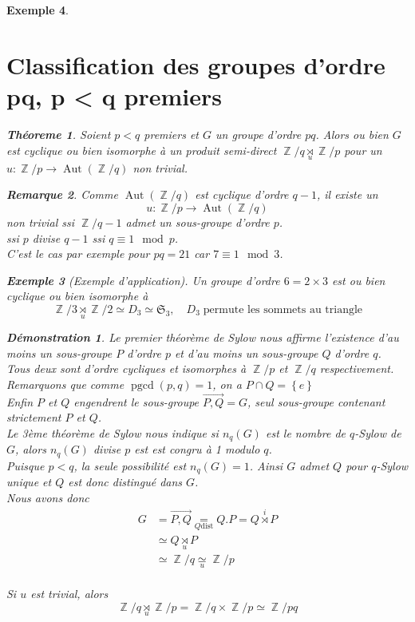 \documentclass[a4paper, oneside]{report}
\theoremstyle{break}
\newtheorem{thm}{Théoreme}[section] %
\newtheorem{exemple}[thm]{Exemple}
\newtheorem{remarque}[thm]{Remarque}
\newtheorem*{demonstration}{Démonstration}
\DeclareMathOperator{\Z}{\mathbb{Z}}
\DeclarePairedDelimiter\ens{\left\{ }{\right\} }%
\DeclareMathOperator{\pgcd}{pgcd}
\DeclareMathOperator{\Aut}{Aut}
\renewcommand{\ens}[1]{\left\{ #1 \right\} }%
\newcommand{\us}{\underset}
\newcommand{\os}{\overset}
\begin{document}
\begin{exemple}
\section{Classification des groupes d'ordre pq, p < q premiers}

\begin{thm}
Soient $p < q$ premiers et $G$ un groupe d'ordre $pq$. Alors ou bien $G$ est cyclique ou bien isomorphe à un produit semi-direct $\Z/q \us{u}{\rtimes} \Z/p$ pour un $u : \Z/p \rightarrow \Aut(\Z/q)$ non trivial.
\end{thm}

\begin{remarque}
Comme $\Aut(\Z/q)$ est cyclique d'ordre $q - 1$, il existe un 
\[
u : \Z/p \rightarrow \Aut(\Z/q)
\]
non trivial ssi $\Z/q-1$ admet un sous-groupe d'ordre $p$.\\
ssi $p$ divise $q - 1$ ssi $q \equiv 1 \mod p$.\\
C'est le cas par exemple pour $pq = 21$ car $7 \equiv 1 \mod 3$.
\end{remarque}

\begin{exemple}[Exemple d'application]
Un groupe d'ordre $6 = 2 \times 3$ est ou bien cyclique ou bien isomorphe à
\[
\Z/3 \us{u}{\rtimes} \Z/2 \simeq D_3	\simeq \mathfrak{S}_3, \quad	D_3 \; \text{permute les sommets au triangle}
\]
\end{exemple}

\begin{demonstration}
Le premier théorème de Sylow nous affirme l'existence d'au moins un sous-groupe $P$ d'ordre $p$ et d'au moins un sous-groupe $Q$ d'ordre $q$. Tous deux sont d'ordre cycliques et isomorphes à $\Z/p$ et $\Z/q$ respectivement. Remarquons que comme $\pgcd(p,q) = 1$, on a $P \cap Q = \ens{e}$\\
Enfin $P$ et $Q$ engendrent le sous-groupe $\vec{P, Q} = G$, seul sous-groupe contenant strictement $P$ et $Q$.\\
Le 3ème théorème de Sylow nous indique si $n_q(G)$ est le nombre de $q$-Sylow de $G$, alors $n_q(G)$ divise $p$ est est congru à 1 modulo $q$.\\
Puisque $p < q$, la seule possibilité est $n_q(G) = 1$. Ainsi $G$ admet $Q$ pour $q$-Sylow unique et $Q$ est donc distingué dans $G$.\\
Nous avons donc
\begin{align*}
G &= \vec{P, Q} \us{Q \text{dist}}{=} Q . P = Q \os{i}{\rtimes} P
\\
&\simeq Q \us{u}{\rtimes} P
\\
&\simeq \Z/q \us{u}{\simeq} \Z/p
\end{align*}\\
Si $u$ est trivial, alors
\[
\Z/q \us{u}{\rtimes} \Z/p = \Z/q \times \Z/p \simeq \Z/pq
\]
\end{demonstration}


\end{exemple}
\end{document}
